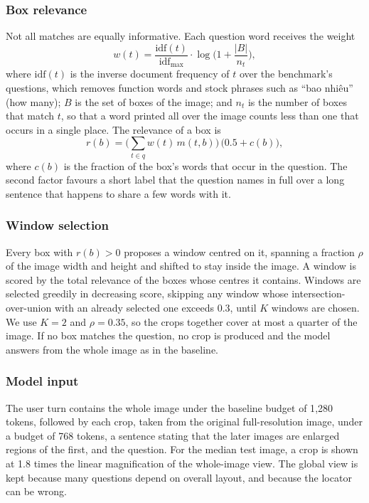 \documentclass[conference]{IEEEtran}
\newcommand{\vi}[1]{{\fontencoding{T5}\selectfont #1}}
\newcommand{\vi}[1]{#1}
\newcommand{\MedianZoom}{1.8}
\begin{document}
\subsubsection{Box relevance}
Not all matches are equally informative. Each question word receives the weight
\begin{equation}
w(t) = \frac{\mathrm{idf}(t)}{\mathrm{idf}_{\max}} \cdot \log\!\Big(1 + \frac{|B|}{n_t}\Big),
\end{equation}
where $\mathrm{idf}(t)$ is the inverse document frequency of $t$ over the benchmark's questions, which removes function words and stock phrases such as ``\vi{bao nhiêu}'' (how many); $B$ is the set of boxes of the image; and $n_t$ is the number of boxes that match $t$, so that a word printed all over the image counts less than one that occurs in a single place. The relevance of a box is
\begin{equation}
r(b) = \Big(\sum_{t \in q} w(t)\, m(t, b)\Big)\,\big(0.5 + c(b)\big),
\end{equation}
where $c(b)$ is the fraction of the box's words that occur in the question. The second factor favours a short label that the question names in full over a long sentence that happens to share a few words with it.

\subsubsection{Window selection}
Every box with $r(b) > 0$ proposes a window centred on it, spanning a fraction $\rho$ of the image width and height and shifted to stay inside the image. A window is scored by the total relevance of the boxes whose centres it contains. Windows are selected greedily in decreasing score, skipping any window whose intersection-over-union with an already selected one exceeds 0.3, until $K$ windows are chosen. We use $K = 2$ and $\rho = 0.35$, so the crops together cover at most a quarter of the image. If no box matches the question, no crop is produced and the model answers from the whole image as in the baseline.

\subsubsection{Model input}
The user turn contains the whole image under the baseline budget of 1{,}280 tokens, followed by each crop, taken from the original full-resolution image, under a budget of 768 tokens, a sentence stating that the later images are enlarged regions of the first, and the question. For the median test image, a crop is shown at \MedianZoom{} times the linear magnification of the whole-image view. The global view is kept because many questions depend on overall layout, and because the locator can be wrong.
\end{document}
